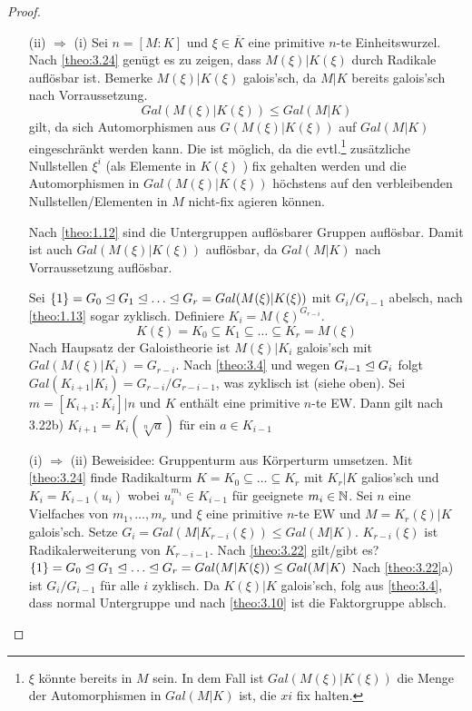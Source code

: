 \documentclass[../main.tex]{subfiles}
\begin{document}
\begin{proof} $ $
    \begin{itemize}
        \item[(ii) $\Rightarrow$ (i)]
        Sei $n=[M:K]$ und $\xi\in\overline{K}$ eine primitive $n$-te Einheitswurzel.
        Nach \ref{theo:3.24} genügt es zu zeigen, dass $M(\xi)|K(\xi)$ durch Radikale auflösbar ist.
        Bemerke $M(\xi)|K(\xi)$ galois'sch, da $M|K$ bereits galois'sch nach Vorraussetzung.
        $$Gal(M(\xi)|K(\xi)) \leq Gal(M|K)$$
        gilt, da sich Automorphismen aus $G(M(\xi)|K(\xi))$ auf $Gal(M|K)$ eingeschränkt werden kann.
        Die ist möglich, da die evtl.\footnote{$\xi$ könnte bereits in $M$ sein. In dem Fall ist $Gal(M(\xi)|K(\xi))$ die Menge der Automorphismen in $Gal(M|K)$ ist, die $xi$ fix halten.} zusätzliche Nullstellen $\xi^i$ (als Elemente in $K(\xi)$ ) fix gehalten werden und die Automorphismen in $Gal(M(\xi)|K(\xi))$ höchstens auf den verbleibenden Nullstellen/Elementen in $M$ nicht-fix agieren können.
        
        Nach \cref{theo:1.12} sind die Untergruppen auflösbarer Gruppen auflösbar. Damit ist auch $Gal(M(\xi)|K(\xi))$ auflösbar, da $Gal(M|K)$ nach Vorraussetzung auflösbar.

        Sei $\trivGO = G_0\nteq G_1\nteq \dots\nteq G_r = Gal(M(\xi)|K(\xi))$ mit $G_i/G_{i-1}$ abelsch, nach \ref{theo:1.13} sogar zyklisch.
        Definiere $K_i=M(\xi)^{G_{r-i}}$.
        $$K(\xi) = K_0\subseteq K_1\subseteq \dots\subseteq K_r = M(\xi)$$
        Nach Haupsatz der Galoistheorie ist $M(\xi)|K_i$ galois'sch mit $Gal(M(\xi)|K_i) = G_{r-i}$.
        Nach \ref{theo:3.4} und wegen $G_{i-1}\trianglelefteq G_i$ folgt $Gal(K_{i+1}|K_i) = G_{r-i}/G_{r-i-1}$, was zyklisch ist (siehe oben).
        Sei $m=[K_{i+1}:K_i]|n$ und $K$ enthält eine primitive $n$-te EW.
        Dann gilt nach 3.22b) $K_{i+1}=K_i(\sqrt[n]{a})$ für ein $a\in K_{i-1}$
        \item[(i) $\Rightarrow$ (ii)]
        Beweisidee: Gruppenturm aus Körperturm umsetzen.
        Mit \cref{theo:3.24} finde Radikalturm $K=K_0\subseteq\dots\subseteq K_r$ mit $K_r|K$ galios'sch und $K_i=K_{i-1}(u_i)$ wobei $u_i^{m_i}\in K_{i-1}$ für geeignete $m_i\in \mathbb{N}$.
        Sei $n$ eine Vielfaches von $m_1,\dots,m_r$ und $\xi$ eine primitive $n$-te EW und $M=K_r(\xi)|K$ galois'sch.
        Setze $G_i = Gal(M|K_{r-i}(\xi))\leq Gal(M|K)$.
        $K_{r-i}(\xi)$ ist Radikalerweiterung von $K_{r-i-1}$.
        Nach \ref{theo:3.22} gilt/gibt es? $\trivGO=G_0\nteq G_1\nteq \dots \nteq G_r = Gal(M|K(\xi))\leq Gal(M|K)$
        Nach \ref{theo:3.22}a) ist $G_i/G_{i-1}$ für alle $i$ zyklisch.
        Da $K(\xi)|K$ galois'sch, folg aus \ref{theo:3.4}, dass normal Untergruppe und nach \ref{theo:3.10} ist die Faktorgruppe ablsch.
    \end{itemize}
\end{proof}
\end{document}
